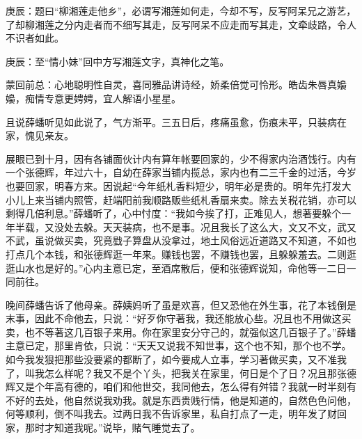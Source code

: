 
\begin{parag}
    \begin{note}庚辰：题曰“柳湘莲走他乡”，必谓写湘莲如何走，今却不写，反写阿呆兄之游艺，了却柳湘莲之分内走者而不细写其走，反写阿呆不应走而写其走，文牵歧路，令人不识者如此。\end{note}
\end{parag}


\begin{parag}
    \begin{note}庚辰：至“情小妹”回中方写湘莲文字，真神化之笔。\end{note}
\end{parag}


\begin{parag}
    \begin{note}蒙回前总：心地聪明性自灵，喜同雅品讲诗经，娇柔倍觉可怜形。皓齿朱唇真嬝嬝，痴情专意更娉娉，宜人解语小星星。\end{note}
\end{parag}


\begin{parag}
    且说薛蟠听见如此说了，气方渐平。三五日后，疼痛虽愈，伤痕未平，只装病在家，愧见亲友。
\end{parag}


\begin{parag}
    展眼已到十月，因有各铺面伙计内有算年帐要回家的，少不得家内治酒饯行。内有一个张德辉，年过六十，自幼在薛家当铺内揽总，家内也有二三千金的过活，今岁也要回家，明春方来。因说起“今年纸札香料短少，明年必是贵的。明年先打发大小儿上来当铺内照管，赶端阳前我顺路贩些纸札香扇来卖。除去关税花销，亦可以剩得几倍利息。”薛蟠听了，心中忖度：“我如今挨了打，正难见人，想著要躲个一年半载，又没处去躲。天天装病，也不是事。况且我长了这么大，文又不文，武又不武，虽说做买卖，究竟戥子算盘从没拿过，地土风俗远近道路又不知道，不如也打点几个本钱，和张德辉逛一年来。赚钱也罢，不赚钱也罢，且躲躲羞去。二则逛逛山水也是好的。”心内主意已定，至酒席散后，便和张德辉说知，命他等一二日一同前往。
\end{parag}


\begin{parag}
    晚间薛蟠告诉了他母亲。薛姨妈听了虽是欢喜，但又恐他在外生事，花了本钱倒是末事，因此不命他去，只说：“好歹你守著我，我还能放心些。况且也不用做这买卖，也不等著这几百银子来用。你在家里安分守己的，就强似这几百银子了。”薛蟠主意已定，那里肯依，只说：“天天又说我不知世事，这个也不知，那个也不学。如今我发狠把那些没要紧的都断了，如今要成人立事，学习著做买卖，又不准我了，叫我怎么样呢？我又不是个丫头，把我关在家里，何日是个了日？况且那张德辉又是个年高有德的，咱们和他世交，我同他去，怎么得有舛错？我就一时半刻有不好的去处，他自然说我劝我。就是东西贵贱行情，他是知道的，自然色色问他，何等顺利，倒不叫我去。过两日我不告诉家里，私自打点了一走，明年发了财回家，那时才知道我呢。”说毕，赌气睡觉去了。
\end{parag}


